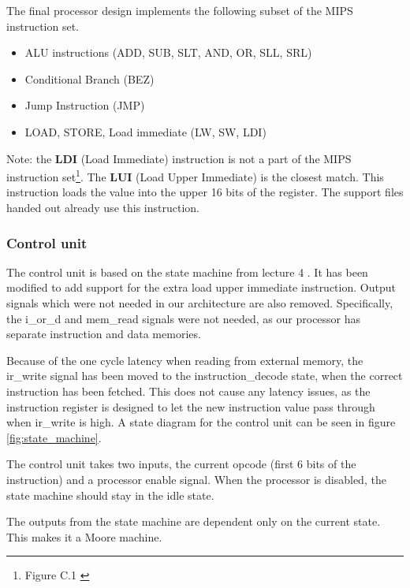 The final processor design implements the following subset of the MIPS instruction set.

\begin{itemize}
    \item ALU instructions (ADD, SUB, SLT, AND, OR, SLL, SRL)
    \item Conditional Branch (BEZ)
    \item Jump Instruction (JMP)
    \item LOAD, STORE, Load immediate (LW, SW, LDI)
\end{itemize}

Note: the {\bf LDI} (Load Immediate) instruction is not a part of the MIPS instruction set\footnote{Figure C.1 \cite[p.66]{compendium}}.
The {\bf LUI} (Load Upper Immediate) is the closest match.
This instruction loads the value into the upper 16 bits of the register.
The support files handed out already use this instruction.

\subsubsection{Control unit}

The control unit is based on the state machine from lecture 4 \cite{lecture-4}.
It has been modified to add support for the extra load upper immediate instruction.
Output signals which were not needed in our architecture are also removed.
Specifically, the i\_or\_d and mem\_read signals were not needed, as our processor has separate instruction and data memories.

Because of the one cycle latency when reading from external memory, the ir\_write signal has been moved to the instruction\_decode state, when the correct instruction has been fetched.
This does not cause any latency issues, as the instruction register is designed to let the new instruction value pass through when ir\_write is high.
A state diagram for the control unit can be seen in figure \ref{fig:state_machine}.

The control unit takes two inputs, the current opcode (first 6 bits of the instruction) and a processor enable signal.
When the processor is disabled, the state machine should stay in the idle state.

The outputs from the state machine are dependent only on the current state.
This makes it a Moore machine.

